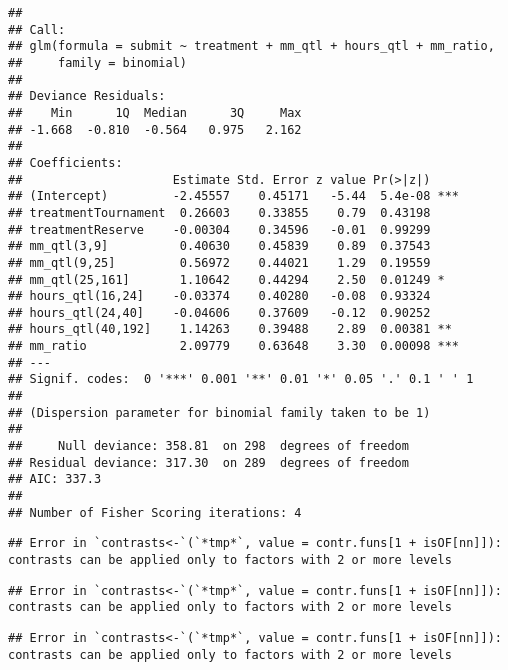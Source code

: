 \documentclass[11pt, titlepage]{article}
\begin{document}
\begin{verbatim}
## 
## Call:
## glm(formula = submit ~ treatment + mm_qtl + hours_qtl + mm_ratio, 
##     family = binomial)
## 
## Deviance Residuals: 
##    Min      1Q  Median      3Q     Max  
## -1.668  -0.810  -0.564   0.975   2.162  
## 
## Coefficients:
##                     Estimate Std. Error z value Pr(>|z|)    
## (Intercept)         -2.45557    0.45171   -5.44  5.4e-08 ***
## treatmentTournament  0.26603    0.33855    0.79  0.43198    
## treatmentReserve    -0.00304    0.34596   -0.01  0.99299    
## mm_qtl(3,9]          0.40630    0.45839    0.89  0.37543    
## mm_qtl(9,25]         0.56972    0.44021    1.29  0.19559    
## mm_qtl(25,161]       1.10642    0.44294    2.50  0.01249 *  
## hours_qtl(16,24]    -0.03374    0.40280   -0.08  0.93324    
## hours_qtl(24,40]    -0.04606    0.37609   -0.12  0.90252    
## hours_qtl(40,192]    1.14263    0.39488    2.89  0.00381 ** 
## mm_ratio             2.09779    0.63648    3.30  0.00098 ***
## ---
## Signif. codes:  0 '***' 0.001 '**' 0.01 '*' 0.05 '.' 0.1 ' ' 1
## 
## (Dispersion parameter for binomial family taken to be 1)
## 
##     Null deviance: 358.81  on 298  degrees of freedom
## Residual deviance: 317.30  on 289  degrees of freedom
## AIC: 337.3
## 
## Number of Fisher Scoring iterations: 4
\end{verbatim}

\begin{verbatim}
## Error in `contrasts<-`(`*tmp*`, value = contr.funs[1 + isOF[nn]]): contrasts can be applied only to factors with 2 or more levels
\end{verbatim}

\begin{verbatim}
## Error in `contrasts<-`(`*tmp*`, value = contr.funs[1 + isOF[nn]]): contrasts can be applied only to factors with 2 or more levels
\end{verbatim}

\begin{verbatim}
## Error in `contrasts<-`(`*tmp*`, value = contr.funs[1 + isOF[nn]]): contrasts can be applied only to factors with 2 or more levels
\end{verbatim}
\end{document}
